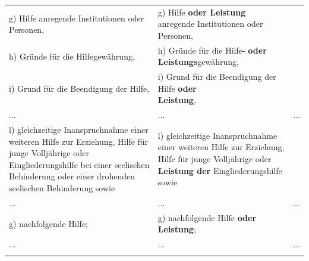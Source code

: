 \documentclass[10pt,a4paper,landscape]{article}
\begin{document}
\begin{longtable}{|L{8.2cm}|L{8.2cm}|L{8.2cm}|}
\hhline{|---|}
g)   \newline Hilfe anregende Institutionen oder  \newline Personen, & g)   \newline Hilfe \textbf{\textcolor{diffred}{oder Leistung}} anregende  \newline Institutionen oder Personen, &  \\
\hhline{|---|}
h)   \newline Gründe für die Hilfegewährung, & h)   \newline Gründe für die Hilfe- \textbf{\textcolor{diffred}{oder  \newline Leistungs}}gewährung, &  \\
\hhline{|---|}
i)   \newline Grund für die Beendigung der Hilfe, & i)   \newline Grund für die Beendigung der Hilfe \textbf{\textcolor{diffred}{oder  \newline Leistung}}, &  \\
\hhline{|---|}
... & ... & ... \\
\hhline{|---|}
l)   \newline gleichzeitige Inanspruchnahme einer  \newline weiteren Hilfe zur Erziehung, Hilfe für junge  \newline Volljährige oder Eingliederungshilfe bei  \newline einer seelischen Behinderung oder einer  \newline drohenden seelischen Behinderung sowie & l)   \newline gleichzeitige Inanspruchnahme einer  \newline weiteren Hilfe zur Erziehung, Hilfe für junge  \newline Volljährige oder \textbf{\textcolor{diffred}{Leistung der}}  \newline Eingliederungshilfe sowie &  \\
\hhline{|---|}
... & ... & ... \\
\hhline{|---|}
g)   \newline nachfolgende Hilfe; & g)   \newline nachfolgende Hilfe \textbf{\textcolor{diffred}{oder Leistung}}; &  \\
\hhline{|---|}
... & ... & ... \\
\hhline{|---|}

\end{longtable}
\end{document}
